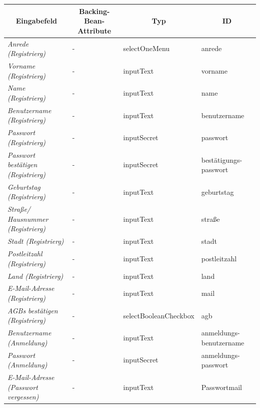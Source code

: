 \begin{itemize}
\begin{itemize}
\begin{center}
\begin{longtable}{|p{3cm} |p{5cm} | p{4cm}|p{3cm}|}
						\hline \multicolumn{1}{|c|}{\textbf{Eingabefeld}} & \multicolumn{1}{|c|}{\textbf{Backing-Bean-Attribute}} & \multicolumn{1}{|c|}{\textbf{Typ}}  &  \multicolumn{1}{|c|}{\textbf{ID}} \\ \hline
						\endfirsthead
						\hline
						\endlastfoot
							\textit{Anrede (Registrierg)} & - & selectOneMenu & anrede \\ \hline
							\textit{Vorname (Registrierg)} & - & inputText & vorname \\ \hline
							\textit{Name (Registrierg)} & - & inputText & name \\ \hline
							\textit{Benutzername (Registrierg)} & - & inputText & benutzername\\ \hline
							\textit{Passwort (Registrierg)} & - & inputSecret & passwort \\ \hline
							\textit{Passwort bestätigen (Registrierg)} &- & inputSecret & bestätigungs- passwort\\ \hline
							\textit{Geburtstag (Registrierg)} & - & inputText & geburtstag \\ \hline
							\textit{Straße/ Hausnummer (Registrierg)} & - & inputText & straße\\ \hline
							\textit{Stadt (Registrierg)} & - & inputText & stadt \\ \hline
							\textit{Postleitzahl (Registrierg)} & - & inputText & postleitzahl \\ \hline
							\textit{Land (Registrierg)} & - & inputText & land \\ \hline
							\textit{E-Mail-Adresse (Registrierg)} & - & inputText & mail\\ \hline
							\textit{AGBs bestätigen (Registrierg)} & - & selectBooleanCheckbox & agb \\ \hline
							\textit{Benutzername (Anmeldung)} & - & inputText & anmeldungs- benutzername \\ \hline
							\textit{Passwort (Anmeldung)} & - & inputSecret & anmeldungs- passwort \\ \hline
							\textit{E-Mail-Adresse (Passwort vergessen)} & - & inputText & Passwortmail \\ \hline
					\end{longtable}
				\end{center}
				
				\begin{center}
					\begin{longtable}{|p{3cm} |p{8cm} | p{5cm}|}
						

\end{longtable}
\end{center}
\end{itemize}
\end{itemize}
